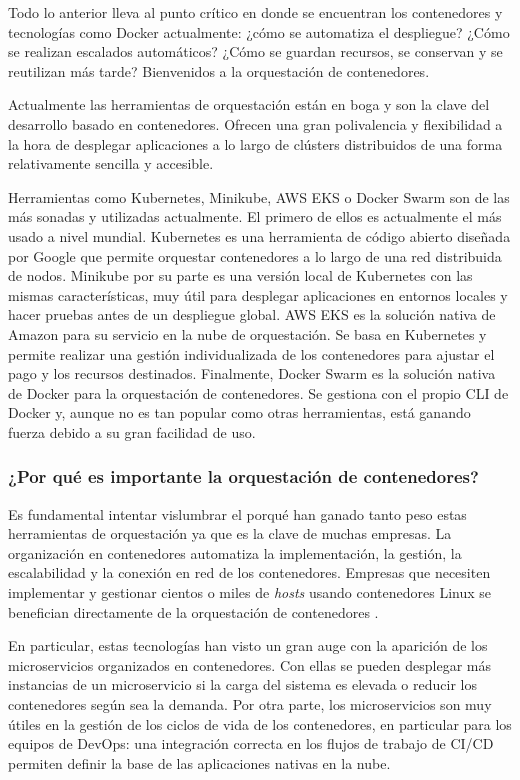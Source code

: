Todo lo anterior lleva al punto crítico en donde se encuentran los contenedores y
tecnologías como Docker actualmente: ¿cómo se automatiza el despliegue? ¿Cómo se
realizan escalados automáticos? ¿Cómo se guardan recursos, se conservan y se
reutilizan más tarde? Bienvenidos a la orquestación de contenedores.

Actualmente las herramientas de orquestación están en boga y son la clave del
desarrollo basado en contenedores. Ofrecen una gran polivalencia y flexibilidad
a la hora de desplegar aplicaciones a lo largo de clústers distribuidos de una
forma relativamente sencilla y accesible.

Herramientas como Kubernetes, Minikube, AWS EKS o Docker Swarm son de las más
sonadas y utilizadas actualmente. El primero de ellos es actualmente el más usado
a nivel mundial. Kubernetes es una herramienta de código abierto diseñada por Google
que permite orquestar contenedores a lo largo de una red distribuida de nodos. Minikube
por su parte es una versión local de Kubernetes con las mismas características,
muy útil para desplegar aplicaciones en entornos locales y hacer pruebas antes
de un despliegue global. AWS EKS es la solución nativa de Amazon para su servicio
en la nube de orquestación. Se basa en Kubernetes y permite realizar una gestión
individualizada de los contenedores para ajustar el pago y los recursos destinados.
Finalmente, Docker Swarm es la solución nativa de Docker para la orquestación de
contenedores. Se gestiona con el propio CLI de Docker y, aunque no es tan popular
como otras herramientas, está ganando fuerza debido a su gran facilidad de uso.

\subsubsection*{¿Por qué es importante la orquestación de contenedores?}
Es fundamental intentar vislumbrar el porqué han ganado tanto peso estas
herramientas de orquestación ya que es la clave de muchas empresas. La organización
en contenedores automatiza la implementación, la gestión, la escalabilidad y la
conexión en red de los contenedores. Empresas que necesiten implementar y
gestionar cientos o miles de \textit{hosts} usando contenedores Linux se benefician
directamente de la orquestación de contenedores \cite{QueEsOrganizacion}.

En particular, estas tecnologías han visto un gran auge con la aparición de los
microservicios organizados en contenedores. Con ellas se pueden desplegar más
instancias de un microservicio si la carga del sistema es elevada o reducir los
contenedores según sea la demanda. Por otra parte, los microservicios son muy
útiles en la gestión de los ciclos de vida de los contenedores, en particular 
para los equipos de DevOps: una integración correcta en los flujos de trabajo de
CI/CD permiten definir la base de las aplicaciones nativas en la nube.

